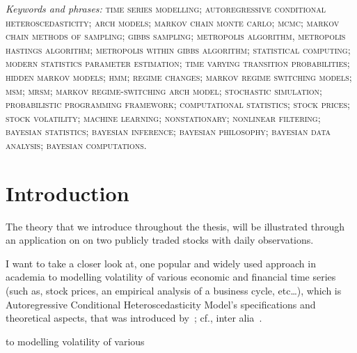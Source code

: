 \documentclass[a4paper,11pt,english]{article}
\begin{document}
{	\noindent \textit{Keywords and phrases:} \textsc{time series modelling; autoregressive conditional heteroscedasticity; arch models; markov chain monte 
	carlo; mcmc; markov chain methods of sampling; gibbs sampling; metropolis algorithm, metropolis hastings algorithm; metropolis within gibbs algorithm; 
	statistical computing; modern statistics parameter estimation; time varying transition probabilities; hidden markov models; hmm; regime changes; markov 
	regime switching models; msm; mrsm; markov regime-switching arch model; stochastic simulation; probabilistic programming framework; computational 	
	statistics; stock prices; stock volatility; machine learning; nonstationary; nonlinear filtering; bayesian statistics; bayesian inference; bayesian 
	philosophy; bayesian data analysis; bayesian computations.}}
	
	
	\pagebreak	
	\clearpage
	\setcounter{page}{1}
	\pagestyle{plain}

	
	\section{Introduction}
	
	The theory that we introduce throughout the thesis, will be illustrated through an application on on two publicly traded stocks with daily 
	observations. \vskip 0.3cm 	

	I want to take a closer look at, one popular and widely used approach in academia to modelling volatility of various economic and financial time
	series (such as, stock prices, an empirical analysis of a business cycle, etc\ldots), which is Autoregressive Conditional Heteroscedasticity Model's
	specifications and theoretical aspects, that was introduced by~\citep{engle82}; cf., inter alia~\citep[p.~308]{hamiltonsusmel}. \vskip 0.3cm 
	
	to modelling volatility of various \vskip 0.3cm 



	
\end{document}
